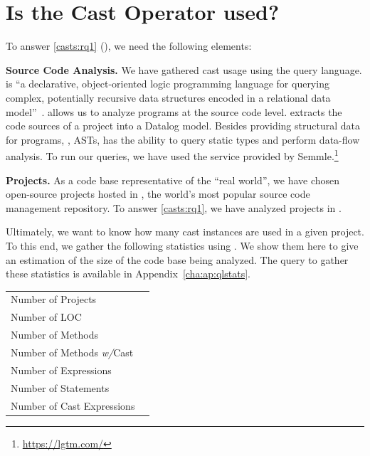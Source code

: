 \section{Is the Cast Operator used?}
\label{sec:casts:stats}



To answer \ref{casts:rq1} (\emph{\crqA}),
we need the following elements:

\textbf{Source Code Analysis.}
We have gathered cast usage using the \ql{} query language.
\ql{} is ``a declarative, object-oriented logic programming language for querying complex, potentially recursive data structures encoded in a relational data model''~\citep{avgustinovQLObjectorientedQueries2016}.
\ql{} allows us to analyze programs at the source code level.
\ql{} extracts the code sources of a project into a Datalog model.
Besides providing structural data for programs, \ie{}, ASTs, \ql{} has the ability to query static types and perform data-flow analysis.
To run our \ql{} queries, we have used the service provided by Semmle.\footnote{\url{https://lgtm.com/}} 

\textbf{Projects.} 
As a code base representative of the ``real world'',
we have chosen open-source projects hosted in \github{},
the world's most popular source code management repository.
To answer \ref{casts:rq1}, we have analyzed \nproject{} \java{} projects in \lgtm{}.

Ultimately, we want to know how many cast instances are used in a given project.
To this end, we gather the following statistics using \ql{}.
We show them here to give an estimation of the size of the code base being analyzed.
The query to gather these statistics is available in Appendix~\ref{cha:ap:qlstats}.

\begin{center}
\begin{tabular}{lr}
	\hline
	Number of Projects 				& \nproject \\
	Number of LOC 					& \nloc{} \\
	Number of Methods 				& \nmethod \\
	Number of Methods \emph{w/}Cast	& \nmethodwithcast \\
    Number of Expressions			& \nexpr \\
    Number of Statements			& \nstmt \\
    Number of Cast Expressions		& \ncast \\
	\hline
\end{tabular}
\end{center}

